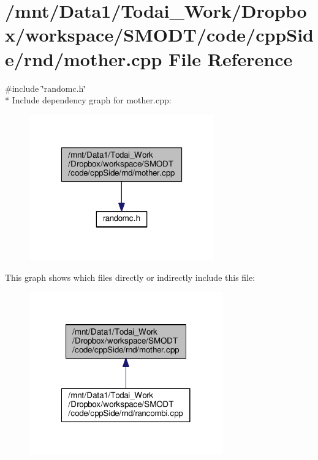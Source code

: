 \section{/mnt/\-Data1/\-Todai\-\_\-\-Work/\-Dropbox/workspace/\-S\-M\-O\-D\-T/code/cpp\-Side/rnd/mother.cpp File Reference}
\label{rnd_2mother_8cpp}
{\ttfamily \#include \char`\"{}randomc.\-h\char`\"{}}\\*
Include dependency graph for mother.\-cpp\-:\nopagebreak
\begin{figure}[H]
\begin{center}
\leavevmode
\includegraphics[width=226pt]{rnd_2mother_8cpp__incl}
\end{center}
\end{figure}
This graph shows which files directly or indirectly include this file\-:\nopagebreak
\begin{figure}[H]
\begin{center}
\leavevmode
\includegraphics[width=236pt]{rnd_2mother_8cpp__dep__incl}
\end{center}
\end{figure}
